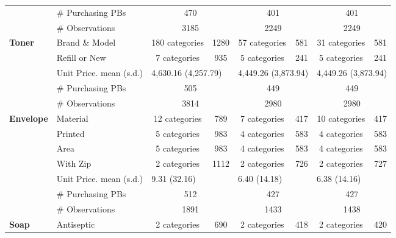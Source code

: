\begin{longtable}{llccccccccc}
 & \# Purchasing PBs & \multicolumn{3}{c}{470} & \multicolumn{3}{c}{401} & \multicolumn{3}{c}{401} \\* 
 & \# Observations & \multicolumn{3}{c}{3185} & \multicolumn{3}{c}{2249} & \multicolumn{3}{c}{2249} \\* 
 \midrule 
 \multirow{5}{*}{\textbf{Toner}} & Brand \& Model & \multicolumn{2}{c}{180 categories} & 1280 & \multicolumn{2}{c}{57 categories} & 581 & \multicolumn{2}{c}{31 categories} & 581 \\* 
 & Refill or New & \multicolumn{2}{c}{7 categories} & 935 & \multicolumn{2}{c}{5 categories} & 241 & \multicolumn{2}{c}{5 categories} & 241 \\* 
 \cmidrule{2-11} 
 & Unit Price. mean (s.d.) & \multicolumn{3}{l}{4,630.16 (4,257.79)} & \multicolumn{3}{l}{4,449.26 (3,873.94)} & \multicolumn{3}{l}{4,449.26 (3,873.94)} \\* 
 & \# Purchasing PBs & \multicolumn{3}{c}{505} & \multicolumn{3}{c}{449} & \multicolumn{3}{c}{449} \\* 
 & \# Observations & \multicolumn{3}{c}{3814} & \multicolumn{3}{c}{2980} & \multicolumn{3}{c}{2980} \\* 
 \midrule 
 \multirow{7}{*}{\textbf{Envelope}} & Material & \multicolumn{2}{c}{12 categories} & 789 & \multicolumn{2}{c}{7 categories} & 417 & \multicolumn{2}{c}{10 categories} & 417 \\* 
 & Printed & \multicolumn{2}{c}{5 categories} & 983 & \multicolumn{2}{c}{4 categories} & 583 & \multicolumn{2}{c}{4 categories} & 583 \\* 
 & Area & \multicolumn{2}{c}{5 categories} & 983 & \multicolumn{2}{c}{4 categories} & 583 & \multicolumn{2}{c}{4 categories} & 583 \\* 
 & With Zip & \multicolumn{2}{c}{2 categories} & 1112 & \multicolumn{2}{c}{2 categories} & 726 & \multicolumn{2}{c}{2 categories} & 727 \\* 
 \cmidrule{2-11} 
 & Unit Price. mean (s.d.) & \multicolumn{3}{l}{9.31 (32.16)} & \multicolumn{3}{l}{6.40 (14.18)} & \multicolumn{3}{l}{6.38 (14.16)} \\* 
 & \# Purchasing PBs & \multicolumn{3}{c}{512} & \multicolumn{3}{c}{427} & \multicolumn{3}{c}{427} \\* 
 & \# Observations & \multicolumn{3}{c}{1891} & \multicolumn{3}{c}{1433} & \multicolumn{3}{c}{1438} \\* 
 \midrule 
 \multirow{10}{*}{\textbf{Soap}} & Antiseptic & \multicolumn{2}{c}{2 categories} & 690 & \multicolumn{2}{c}{2 categories} & 418 & \multicolumn{2}{c}{2 categories} & 420 \\* 

\end{longtable}
